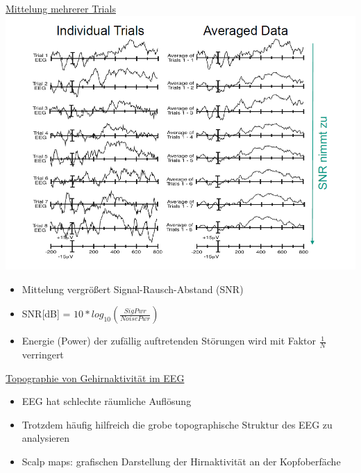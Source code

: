 \documentclass[a4paper,10pt,oneside]{article}
\begin{document}
\underline{Mittelung mehrerer Trials} \\
	\includegraphics[scale=0.2]{Grafiken/1940.png}
	
	\begin{itemize}
		\item Mittelung vergrößert Signal-Rausch-Abstand (SNR)
		\item SNR[dB] = $10 * log_{10} (\frac{SigPwr}{NoisePwr})$
		\item Energie (Power) der zufällig auftretenden Störungen wird mit Faktor $\frac{1}{N}$ verringert 
	\end{itemize}
	
\underline{Topographie von Gehirnaktivität im EEG} \\
	\begin{itemize}
		\item EEG hat schlechte räumliche Auflösung
		\item Trotzdem häufig hilfreich die grobe topographische Struktur des EEG zu analysieren
		\item Scalp maps: grafischen Darstellung der Hirnaktivität an der Kopfoberfäche
	\end{itemize}
	
\end{document}
